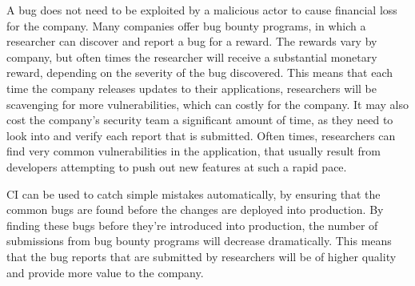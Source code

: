 	A bug does not need to be exploited by a malicious actor to cause financial loss for the company. Many companies offer bug bounty programs, in which a researcher can discover and report a bug 
    for a reward. The rewards vary by company, but often times the researcher will receive a substantial monetary reward, depending on the severity of the bug discovered. This means that each time 
    the company releases updates to their applications, researchers will be scavenging for more vulnerabilities, which can costly for the company. It may also cost the company's security team a 
    significant amount of time, as they need to look into and verify each report that is submitted. Often times, researchers can find very common vulnerabilities in the application, that usually 
    result from developers attempting to push out new features at such a rapid pace.

	CI can be used to catch simple mistakes automatically, by ensuring that the common bugs are found before the changes are deployed into production. By finding these bugs before they're introduced 
    into production, the number of submissions from bug bounty programs will decrease dramatically. This means that the bug reports that are submitted by researchers will be of higher quality and 
    provide more value to the company.



